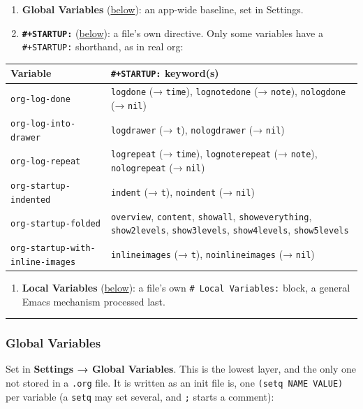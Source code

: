 \documentclass[11pt]{article}
\begin{document}
\begin{enumerate}
\item \textbf{Global Variables} (\hyperref[sec:org7489ccb]{below}): an app-wide baseline, set in Settings.
\item \textbf{\texttt{\#+STARTUP:}} (\hyperref[sec:org4faaf88]{below}): a file's own directive. Only some variables have a \texttt{\#+STARTUP:} shorthand, as in real org:
\end{enumerate}

\begin{center}
\begin{tabular}{ll}
Variable & \texttt{\#+STARTUP:} keyword(s)\\[0pt]
\hline
\texttt{org-log-done} & \texttt{logdone} (→ \texttt{time}), \texttt{lognotedone} (→ \texttt{note}), \texttt{nologdone} (→ \texttt{nil})\\[0pt]
\texttt{org-log-into-drawer} & \texttt{logdrawer} (→ \texttt{t}), \texttt{nologdrawer} (→ \texttt{nil})\\[0pt]
\texttt{org-log-repeat} & \texttt{logrepeat} (→ \texttt{time}), \texttt{lognoterepeat} (→ \texttt{note}), \texttt{nologrepeat} (→ \texttt{nil})\\[0pt]
\texttt{org-startup-indented} & \texttt{indent} (→ \texttt{t}), \texttt{noindent} (→ \texttt{nil})\\[0pt]
\texttt{org-startup-folded} & \texttt{overview}, \texttt{content}, \texttt{showall}, \texttt{showeverything}, \texttt{show2levels}, \texttt{show3levels}, \texttt{show4levels}, \texttt{show5levels}\\[0pt]
\texttt{org-startup-with-inline-images} & \texttt{inlineimages} (→ \texttt{t}), \texttt{noinlineimages} (→ \texttt{nil})\\[0pt]
\end{tabular}
\end{center}

\begin{enumerate}
\item \textbf{Local Variables} (\hyperref[sec:org761a631]{below}): a file's own \texttt{\# Local Variables:} block, a general Emacs mechanism processed last.
\end{enumerate}

\noindent\rule{\textwidth}{0.5pt}

\subsubsection{Global Variables}
\label{sec:org7489ccb}
Set in \textbf{Settings → Global Variables}. This is the lowest layer, and the only one not stored in a \texttt{.org} file. It is written as an init file is, one \texttt{(setq NAME VALUE)} per variable (a \texttt{setq} may set several, and \texttt{;} starts a comment):
\end{document}
